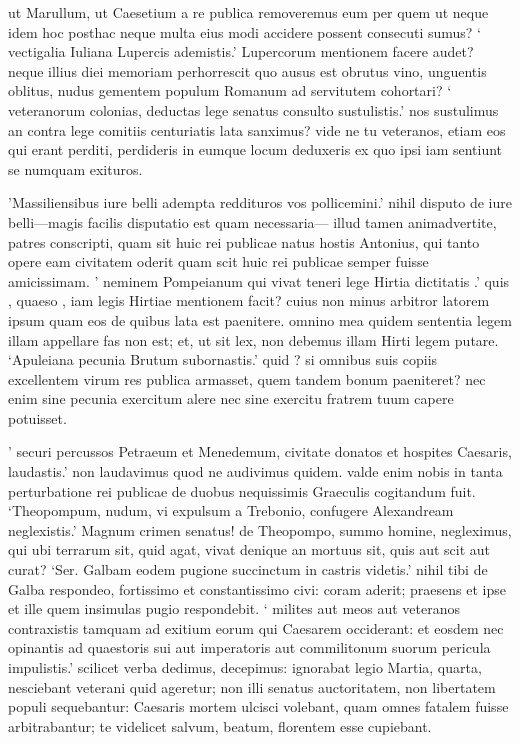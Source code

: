  ut Marullum, ut Caesetium a re publica removeremus eum per quem ut neque idem hoc posthac neque multa eius modi accidere possent consecuti sumus? ` vectigalia Iuliana Lupercis ademistis.' Lupercorum mentionem facere audet? neque illius diei memoriam perhorrescit quo ausus est obrutus vino, unguentis oblitus, nudus gementem populum Romanum ad servitutem cohortari? ` veteranorum colonias, deductas lege senatus consulto sustulistis.' nos sustulimus an contra lege comitiis centuriatis lata sanximus? vide ne tu veteranos, etiam eos qui erant perditi, perdideris in eumque locum deduxeris ex quo ipsi iam sentiunt se numquam exituros.

 'Massiliensibus iure belli adempta reddituros vos pollicemini.' nihil disputo de iure belli—magis facilis disputatio est quam necessaria— illud tamen animadvertite, patres conscripti, quam sit huic rei publicae natus hostis Antonius, qui tanto opere eam civitatem oderit quam scit huic rei publicae semper fuisse amicissimam. ' neminem Pompeianum qui vivat teneri lege Hirtia dictitatis .' quis , quaeso , iam legis Hirtiae mentionem facit? cuius non minus arbitror latorem ipsum quam eos de quibus lata est paenitere. omnino mea quidem sententia legem illam appellare fas non est; et, ut sit lex, non debemus illam Hirti legem putare. `Apuleiana pecunia Brutum subornastis.' quid ? si omnibus suis copiis excellentem virum res publica armasset, quem tandem bonum paeniteret? nec enim sine pecunia exercitum alere nec sine exercitu fratrem tuum capere potuisset.

 ' securi percussos Petraeum et Menedemum, civitate donatos et hospites Caesaris, laudastis.' non laudavimus quod ne audivimus quidem. valde enim nobis in tanta perturbatione rei publicae de duobus nequissimis Graeculis cogitandum fuit. `Theopompum, nudum, vi expulsum a Trebonio, confugere Alexandream neglexistis.' Magnum crimen senatus! de Theopompo, summo homine, negleximus, qui ubi terrarum sit, quid agat, vivat denique an mortuus sit, quis aut scit aut curat? `Ser. Galbam eodem pugione succinctum in castris videtis.' nihil tibi de Galba respondeo, fortissimo et constantissimo civi: coram aderit; praesens et ipse et ille quem insimulas pugio respondebit. ` milites aut meos aut veteranos contraxistis tamquam ad exitium eorum qui Caesarem occiderant: et eosdem nec opinantis ad quaestoris sui aut imperatoris aut commilitonum suorum pericula impulistis.' scilicet verba dedimus, decepimus: ignorabat legio Martia, quarta, nesciebant veterani quid ageretur; non illi senatus auctoritatem, non libertatem populi sequebantur: Caesaris mortem ulcisci volebant, quam omnes fatalem fuisse arbitrabantur; te videlicet salvum, beatum, florentem esse cupiebant.

